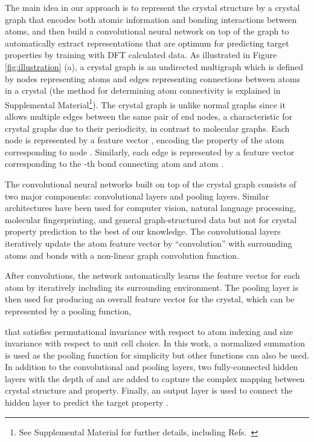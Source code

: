 \documentclass[twocolumn, prl]{revtex4-1}
\begin{document}
The main idea in our approach is to represent the crystal structure by a crystal graph that encodes both atomic information and bonding interactions between atoms, and then build a convolutional neural network on top of the graph to automatically extract representations that are optimum for predicting target properties by training with DFT calculated data. As illustrated in Figure \ref{fig:illustration} (a), a crystal graph  is an undirected multigraph which is defined by nodes representing atoms and edges representing connections between atoms in a crystal (the method for determining atom connectivity is explained in Supplemental Material\footnote{See Supplemental Material for further details, including Refs.~\cite{sanderson1951interpretation, sanderson1952explanation, cordero2008covalent, kramida2013nist, haynes2014crc, kingma2014adam, srivastava2014dropout, de2015charting, isayev2017universal, blatov2004voronoi}}). The crystal graph is unlike normal graphs since it allows multiple edges between the same pair of end nodes, a characteristic for crystal graphs due to their periodicity, in contrast to molecular graphs. Each node  is represented by a feature vector , encoding the property of the atom corresponding to node . Similarly, each edge  is represented by a feature vector  corresponding to the -th bond connecting atom  and atom .

The convolutional neural networks built on top of the crystal graph consists of two major components: convolutional layers and pooling layers. Similar architectures have been used for computer vision\cite{krizhevsky2012imagenet}, natural language processing\cite{collobert2008unified}, molecular fingerprinting\cite{duvenaud2015convolutional}, and general graph-structured data\cite{henaff2015deep, GilmerSRVD17} but not for crystal property prediction to the best of our knowledge. The convolutional layers iteratively update the atom feature vector  by ``convolution'' with surrounding atoms and bonds with a non-linear graph convolution function.

After  convolutions, the network automatically learns the feature vector  for each atom by iteratively including its surrounding environment. The pooling layer is then used for producing an overall feature vector  for the crystal, which can be represented by a pooling function,

that satisfies permutational invariance with respect to atom indexing and size invariance with respect to unit cell choice. In this work, a normalized summation is used as the pooling function for simplicity but other functions can also be used. In addition to the convolutional and pooling layers, two fully-connected hidden layers with the depth of  and  are added to capture the complex mapping between crystal structure and property. Finally, an output layer is used to connect the  hidden layer to predict the target property . 
\end{document}
